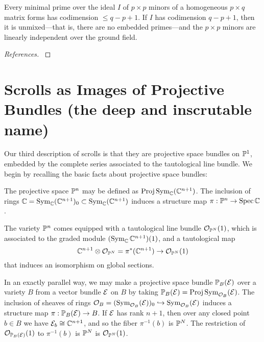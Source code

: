 \begin{fact}\label{Macaulay's Theorem} Every minimal prime over the ideal $I$ of $p\times p$ minors of a homogeneous $p\times q$ matrix forms has codimension $\leq q-p+1$. If $I$ has codimension $q-p+1$, then it is unmixed---that is, there are no embedded primes---and the $p\times p$ minors are linearly independent over the ground field.
\end{fact}

\begin{proof}[References]
\cite[ Theorem *** ]{Ei}
\end{proof}


\section{Scrolls as Images of Projective Bundles (the deep and inscrutable name)}\label{inscrutable name}

 
 Our third description of scrolls is that they are projective space bundles on ${\mathbb P}^{1}$, embedded by the complete series associated to the tautological line bundle. We begin by recalling the basic facts about projective space bundles:
 
The projective space ${\mathbb P}^{n}$ may be defined as $\operatorname{Proj} \operatorname{Sym}_{{\mathbb C}}({\mathbb C}^{n+1})$. The inclusion
of rings ${\mathbb C} = \operatorname{Sym}_{{\mathbb C}}({\mathbb C}^{n+1})_{0}\subset \operatorname{Sym}_{{\mathbb C}}({\mathbb C}^{n+1})$ induces a structure map
$\pi: {\mathbb P}^{n}\to \operatorname{Spec} {\mathbb C}$. 

The variety ${\mathbb P}^{n}$ comes equipped with a tautological line bundle ${\mathcal O}_{{\mathbb P}^{N}}(1)$, which is associated to the graded module $(\operatorname{Sym}_{{\mathbb C}} {\mathbb C}^{n+1})(1)$, and a tautological map 
$$
{\mathbb C}^{n+1}\otimes {\mathcal O}_{{\mathbb P}^{N}} =\pi^{*}({\mathbb C}^{n+1}) \to {\mathcal O}_{{\mathbb P}^{N}}(1)
$$
that induces an isomorphism on global sections.

In an exactly parallel way, we may make a projective space bundle ${\mathbb P}_B({\mathcal E})$ over a variety $B$ from a vector bundle ${\mathcal E}$ on  $B$ 
by taking ${\mathbb P}_B({\mathcal E}) = \operatorname{Proj} \operatorname{Sym}_{{\mathcal O}_{B}} ({\mathcal E})$.
The inclusion of sheaves of rings
${\mathcal O}_{B}  = (\operatorname{Sym}_{{\mathcal O}_{B}}({\mathcal E}))_{0} \hookrightarrow \operatorname{Sym}_{{\mathcal O}_{B}}({\mathcal E})$ induces a structure map
$\pi: {\mathbb P}_B({\mathcal E}) \to B$. If ${\mathcal E}$ has rank $n+1$, then over any closed point $b\in B$ we have
${\mathcal E}_{b} \cong {\mathbb C}^{n+1}$, and so the fiber $\pi^{-1}(b)$ is ${\mathbb P}^{N}$. The restriction of 
${\mathcal O}_{{\mathbb P}_B({\mathcal E})}(1)$ to $\pi^{-1}(b)$ is ${\mathbb P}^{N}$ is ${\mathcal O}_{{\mathbb P}^{N}}(1)$.

